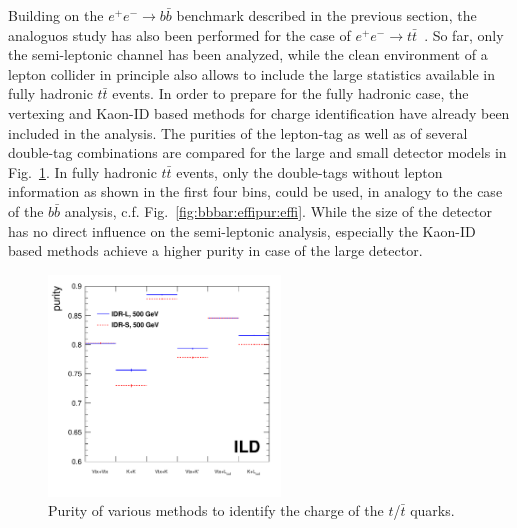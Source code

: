 Building on the $e^+e^- \to b\bar{b}$ benchmark described in the previous section, the analoguos study has also been performed for the case of $e^+e^- \to t\bar{t}$~\cite{ILDNote:bbtt}. So far, only the semi-leptonic channel has been analyzed, while the clean environment of a lepton collider in principle also allows to include the large statistics available in fully hadronic $t\bar{t}$ events. In order to prepare for the fully hadronic case, the vertexing and Kaon-ID based methods for charge identification have already been included in the analysis. The purities of the lepton-tag as well as of several double-tag combinations are compared for the large and small detector models in Fig.~\ref{fig:ttbar:effi}. In fully hadronic $t\bar{t}$ events, only the double-tags without lepton information as shown in the first four bins, could be used, in analogy to the case of the $b\bar{b}$ analysis, c.f. Fig.~\ref{fig:bbbar:effipur:effi}.
While the size of the detector has no direct influence on the semi-leptonic analysis, especially the Kaon-ID based methods achieve a higher purity in case of the large detector. 


\begin{figure}[htbp]
\begin{center} \includegraphics[width=0.55\textwidth]{Performance/fig/p_value_l5_ele_mu_noLcut-v1.pdf}
\end{center}
\caption{Purity of various methods to identify the charge of the $t$/$\bar{t}$ quarks.}
\label{fig:ttbar:effi}
\end{figure}

